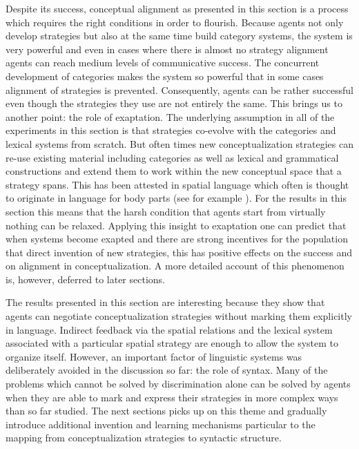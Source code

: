 Despite its success, conceptual alignment as presented in this section is a process
which requires the right conditions in order to flourish. Because agents not only develop 
strategies but also at the same time build category systems, the system is very powerful
and even in cases where there is almost no strategy alignment agents can
reach medium levels of communicative success. The concurrent development of 
categories makes the system so powerful that in some cases alignment of strategies is prevented.
Consequently, agents can be rather successful even though the strategies they use are
not entirely the same. This brings us to another point: the role of exaptation. The underlying assumption
in all of the experiments in this section is that strategies co-evolve with the categories
and lexical systems from scratch. But often times new conceptualization strategies can re-use
existing material including categories as well as lexical and grammatical constructions 
and extend them to work within the new conceptual space that a strategy spans. This has been attested in 
spatial language which often is thought to originate in language for body parts (see 
for example \citealt{maclaury1989zapotec}). For the results in this section this means 
that the harsh condition that agents
start from virtually nothing can be relaxed. 
Applying this insight to exaptation one can predict that when systems become exapted 
and there are strong incentives for the population that direct invention of new strategies,
this has positive effects on the success and on alignment in conceptualization. 
A more detailed account of this phenomenon is, however, deferred to later sections.


The results presented in this section are interesting because they show that
agents can negotiate conceptualization strategies without marking them explicitly in
language. Indirect feedback via the spatial relations and the lexical system associated
with a particular spatial strategy are enough to allow the system to organize itself. 
However, an important factor of linguistic systems was deliberately avoided in the discussion so far:
the role of syntax. Many of the problems which cannot be solved by discrimination alone 
can be solved by agents when they are able to mark and express their strategies in more
complex ways than so far studied. The next sections picks up on this theme and gradually
introduce additional invention and learning mechanisms particular to the mapping from 
conceptualization strategies to syntactic structure.


% 
% 
% 